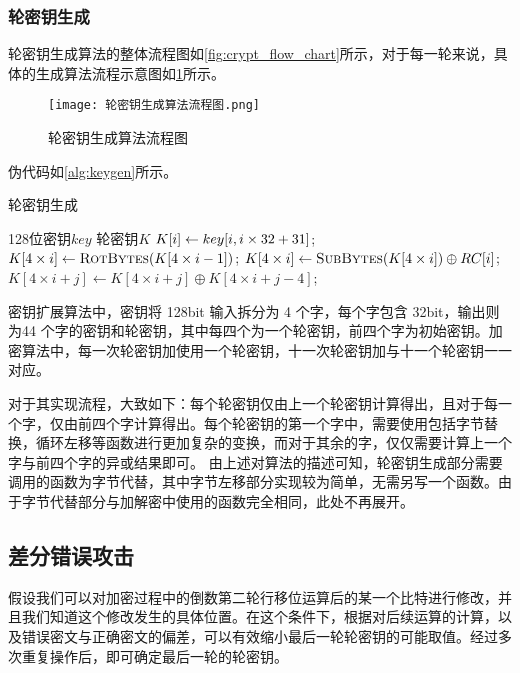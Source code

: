 \documentclass[a4paper, zihao=-4, UTF-8]{ctexart}
\begin{document}
	\subsubsection{轮密钥生成}
	轮密钥生成算法的整体流程图如\cref{fig:crypt_flow_chart}所示，对于每一轮来说，具体的生成算法流程示意图如\cref{fig:crypt_flow}所示。
	
	\begin{figure}[htbp]
		\centering
		\texttt{[image: 轮密钥生成算法流程图.png]}
		\caption{轮密钥生成算法流程图}
		\label{fig:crypt_flow}
	\end{figure}
	
	伪代码如\cref{alg:keygen}所示。
	
	\begin{algorithm}[htbp]
		\caption{轮密钥生成}
		\label{alg:keygen}
		\begin{algorithmic}[1]
			\Require 128位密钥$key$
			\Ensure 轮密钥$K$
				\State $K[i]\gets key[i \time 32, i\times 32 + 31]$;
			\EndFor
				\State $K[4\times i]\gets \Call{RotBytes}{K[4\times i - 1]}$;
				\State $K[4\times i]\gets \Call{SubBytes}{K[4\times i]}\oplus RC[i]$;
					\State $K[4\times i + j]\gets K[4 \times i + j]\oplus K[4\times i + j - 4]$;
				\EndFor
			\EndFor
			\State {}
			\EndFunction
		\end{algorithmic}
	\end{algorithm}
	
	密钥扩展算法中，密钥将 128bit 输入拆分为 4 个字，每个字包含 32bit，输出则为44 个字的密钥和轮密钥，其中每四个为一个轮密钥，前四个字为初始密钥。加密算法中，每一次轮密钥加使用一个轮密钥，十一次轮密钥加与十一个轮密钥一一对应。
	
	对于其实现流程，大致如下：每个轮密钥仅由上一个轮密钥计算得出，且对于每一个字，仅由前四个字计算得出。每个轮密钥的第一个字中，需要使用包括字节替换，循环左移等函数进行更加复杂的变换，而对于其余的字，仅仅需要计算上一个字与前四个字的异或结果即可。
	由上述对算法的描述可知，轮密钥生成部分需要调用的函数为字节代替，其中字节左移部分实现较为简单，无需另写一个函数。由于字节代替部分与加解密中使用的函数完全相同，此处不再展开。
	
	\subsection{差分错误攻击}
	
	假设我们可以对加密过程中的倒数第二轮行移位运算后的某一个比特进行修改，并且我们知道这个修改发生的具体位置。在这个条件下，根据对后续运算的计算，以及错误密文与正确密文的偏差，可以有效缩小最后一轮轮密钥的可能取值。经过多次重复操作后，即可确定最后一轮的轮密钥。
	
\end{document}
